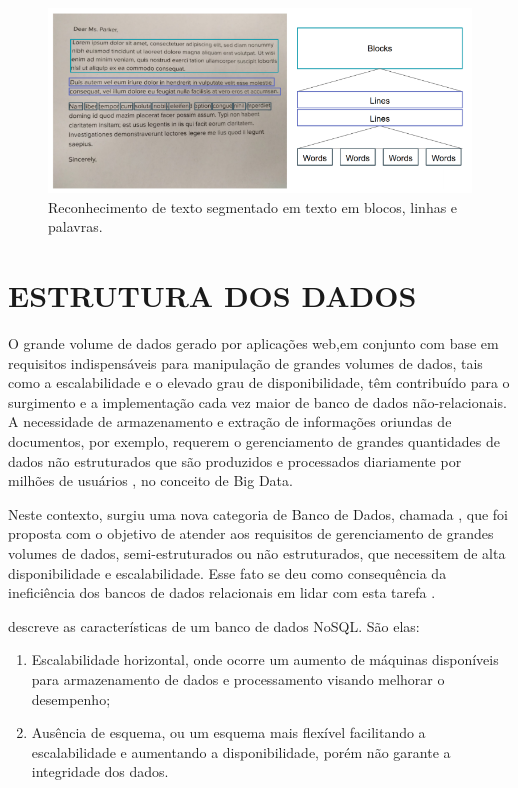  \begin{figure}[h]
	\centering
	
	\includegraphics[width=1.0\textwidth]{Imagens/estruturatexto} 
	\caption[Reconhecimento de texto segmentado em texto em blocos, linhas e palavras.]{Reconhecimento de texto segmentado em texto em blocos, linhas e palavras.}
	\label{fig:estruturatexto}
\end{figure}

\section{ESTRUTURA DOS DADOS}

O grande volume de dados gerado por aplicações web,em conjunto com base em requisitos indispensáveis para manipulação de grandes volumes de dados, tais como a escalabilidade e o elevado grau de disponibilidade, têm contribuído para o surgimento e a implementação cada vez maior de banco de dados não-relacionais. A necessidade de armazenamento e extração de informações oriundas de documentos, por exemplo, requerem o gerenciamento de grandes quantidades de dados não estruturados que são produzidos e processados diariamente por milhões de usuários \cite{LOSCIO}, no conceito de Big Data.

Neste contexto, surgiu uma nova categoria de Banco de Dados, chamada , que foi proposta com o objetivo de atender aos requisitos de gerenciamento de grandes volumes de dados, semi-estruturados ou não estruturados, que necessitem de alta disponibilidade e escalabilidade. Esse fato se deu como consequência da ineficiência dos bancos de dados relacionais em lidar com esta tarefa \cite{LOSCIO}.

 descreve as características de um banco de dados NoSQL. São elas: 
 \begin{enumerate}
   \item Escalabilidade horizontal, onde ocorre um aumento de máquinas disponíveis para armazenamento de dados e processamento visando melhorar o desempenho;
   \item Ausência de esquema, ou um esquema mais flexível facilitando a escalabilidade e aumentando a disponibilidade, porém não garante a integridade dos dados. 

 \end{enumerate}

